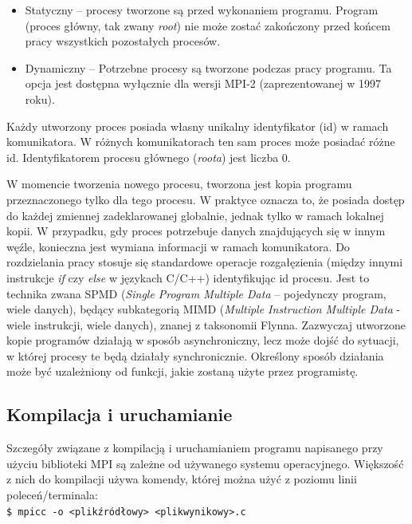 \begin{itemize}
	\item Statyczny -- procesy tworzone są przed wykonaniem programu. Program (proces główny, tak zwany \textit{root}) nie może zostać zakończony przed końcem pracy wszystkich pozostałych procesów.
	\item Dynamiczny -- Potrzebne procesy są tworzone podczas pracy programu. Ta opcja jest dostępna wyłącznie dla wersji MPI-2 (zaprezentowanej w 1997 roku).
\end{itemize}

Każdy utworzony proces posiada własny unikalny identyfikator (id) w ramach komunikatora. W różnych komunikatorach ten sam proces może posiadać różne id. Identyfikatorem procesu głównego (\textit{roota}) jest liczba 0.

W momencie tworzenia nowego procesu, tworzona jest kopia programu przeznaczonego tylko dla tego procesu. W praktyce oznacza to, że posiada dostęp do każdej zmiennej zadeklarowanej globalnie, jednak tylko w ramach lokalnej kopii. W przypadku, gdy proces potrzebuje danych znajdujących się w innym węźle, konieczna jest wymiana informacji w ramach komunikatora. Do rozdzielania pracy stosuje się standardowe operacje rozgałęzienia (między innymi instrukcje \textit{if} czy \textit{else} w językach C/C++) identyfikując id procesu. Jest to technika zwana SPMD (\textit{Single Program Multiple Data} -- pojedynczy program, wiele danych), będący subkategorią MIMD (\textit{Multiple Instruction Multiple Data} - wiele instrukcji, wiele danych), znanej z taksonomii Flynna. Zazwyczaj utworzone kopie programów działają w sposób asynchroniczny, lecz może dojść do sytuacji, w której procesy te będą działały synchronicznie. Określony sposób działania może być uzależniony od funkcji, jakie zostaną użyte przez programistę.

\subsection{Kompilacja i uruchamianie}

Szczegóły związane z kompilacją i uruchamianiem programu napisanego przy użyciu biblioteki MPI są zależne od używanego systemu operacyjnego. Większość z nich do kompilacji używa komendy, której można użyć z poziomu linii poleceń/terminala: \\

\texttt{\$ mpicc -o <plik\textunderscore źródłowy> <plik\textunderscore wynikowy>.c} \\


